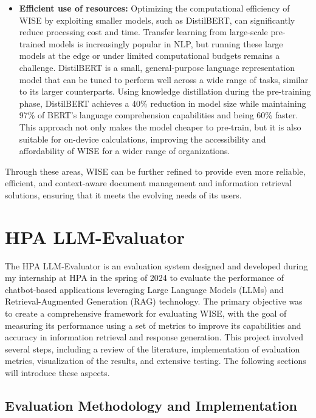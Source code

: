 \begin{itemize}
    \item \textbf{Efficient use of resources:} Optimizing the computational efficiency of WISE by exploiting smaller models, such as DistilBERT, can significantly reduce processing cost and time. Transfer learning from large-scale pre-trained models is increasingly popular in NLP, but running these large models at the edge or under limited computational budgets remains a challenge. DistilBERT is a small, general-purpose language representation model that can be tuned to perform well across a wide range of tasks, similar to its larger counterparts. Using knowledge distillation during the pre-training phase, DistilBERT achieves a 40\% reduction in model size while maintaining 97\% of BERT's language comprehension capabilities and being 60\% faster. This approach not only makes the model cheaper to pre-train, but it is also suitable for on-device calculations, improving the accessibility and affordability of WISE for a wider range of organizations. \cite{sanh2019distilbert}
\end{itemize}

Through these areas, WISE can be further refined to provide even more reliable, efficient, and context-aware document management and information retrieval solutions, ensuring that it meets the evolving needs of its users.

\newpage

\section{HPA LLM-Evaluator}

The HPA LLM-Evaluator is an evaluation system designed and developed during my internship at HPA in the spring of 2024 to evaluate the performance of chatbot-based applications leveraging Large Language Models (LLMs) and Retrieval-Augmented Generation (RAG) technology. The primary objective was to create a comprehensive framework for evaluating WISE, with the goal of measuring its performance using a set of metrics to improve its capabilities and accuracy in information retrieval and response generation. This project involved several steps, including a review of the literature, implementation of evaluation metrics, visualization of the results, and extensive testing. The following sections will introduce these aspects.

\subsection{Evaluation Methodology and Implementation}

